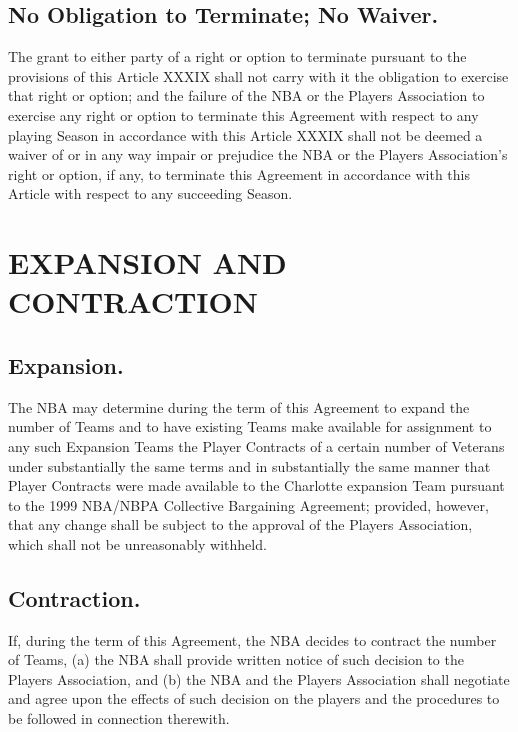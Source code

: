 \documentclass[
]{book}
\begin{document}
\hypertarget{no-obligation-to-terminate-no-waiver.}{%
\section{No Obligation to Terminate; No Waiver.}\label{no-obligation-to-terminate-no-waiver.}}

The grant to either party of a right or option to terminate pursuant to the provisions of this Article XXXIX shall not carry with it the obligation to exercise that right or option; and the failure of the NBA or the Players Association to exercise any right or option to terminate this Agreement with respect to any playing Season in accordance with this Article XXXIX shall not be deemed a waiver of or in any way impair or prejudice the NBA or the Players Association's right or option, if any, to terminate this Agreement in accordance with this Article with respect to any succeeding Season.

\hypertarget{expansion-and-contraction}{%
\chapter{EXPANSION AND CONTRACTION}\label{expansion-and-contraction}}

\hypertarget{expansion.}{%
\section{Expansion.}\label{expansion.}}

The NBA may determine during the term of this Agreement to expand the number of Teams and to have existing Teams make available for assignment to any such Expansion Teams the Player Contracts of a certain number of Veterans under substantially the same terms and in substantially the same manner that Player Contracts were made available to the Charlotte expansion Team pursuant to the 1999 NBA/NBPA Collective Bargaining Agreement; provided, however, that any change shall be subject to the approval of the Players Association, which shall not be unreasonably withheld.

\hypertarget{contraction.}{%
\section{Contraction.}\label{contraction.}}

If, during the term of this Agreement, the NBA decides to contract the number of Teams, (a) the NBA shall provide written notice of such decision to the Players Association, and (b) the NBA and the Players Association shall negotiate and agree upon the effects of such decision on the players and the procedures to be followed in connection therewith.
\end{document}
